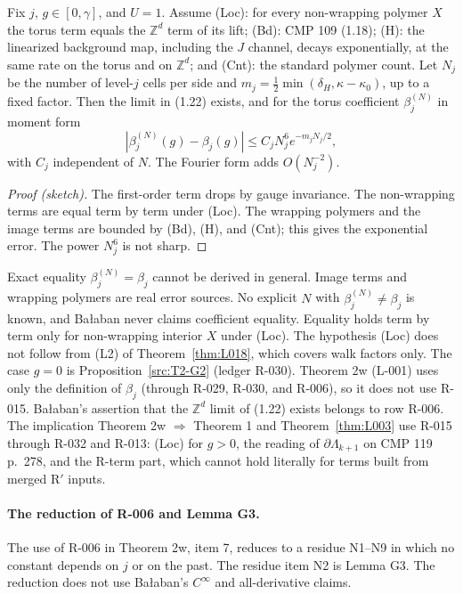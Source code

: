 \begin{proposition}\label{prop:L024}
Fix $j$, $g\in[0,\gamma]$, and $U=1$. Assume (Loc): for every non-wrapping polymer $X$ the torus term equals the $\mathbb Z^d$ term of its lift; (Bd): CMP 109 (1.18); (H): the linearized background map, including the $J$ channel, decays exponentially, at the same rate on the torus and on $\mathbb Z^d$; and (Cnt): the standard polymer count. Let $N_j$ be the number of level-$j$ cells per side and $m_j=\tfrac12\min(\delta_H,\kappa-\kappa_0)$, up to a fixed factor. Then the limit in (1.22) exists, and for the torus coefficient $\beta_j^{(N)}$ in moment form
\[ |\beta_j^{(N)}(g)-\beta_j(g)|\le C_jN_j^6e^{-m_jN_j/2}, \]
with $C_j$ independent of $N$. The Fourier form adds $O(N_j^{-2})$.
\end{proposition}
\begin{proof}[Proof (sketch)]
The first-order term drops by gauge invariance. The non-wrapping terms are equal term by term under (Loc). The wrapping polymers and the image terms are bounded by (Bd), (H), and (Cnt); this gives the exponential error. The power $N_j^6$ is not sharp.
\end{proof}
Exact equality $\beta_j^{(N)}=\beta_j$ cannot be derived in general. Image terms and wrapping polymers are real error sources. No explicit $N$ with $\beta_j^{(N)}\ne\beta_j$ is known, and Ba{\l}aban never claims coefficient equality. Equality holds term by term only for non-wrapping interior $X$ under (Loc). The hypothesis (Loc) does not follow from (L2) of Theorem~\ref{thm:L018}, which covers walk factors only. The case $g=0$ is Proposition~\ref{src:T2-G2} (ledger R-030).
Theorem 2w (L-001) uses only the definition of $\beta_j$ (through R-029, R-030, and R-006), so it does not use R-015. Ba{\l}aban's assertion that the $\mathbb Z^d$ limit of (1.22) exists belongs to row R-006. The implication Theorem 2w $\Rightarrow$ Theorem 1 and Theorem~\ref{thm:L003} use R-015 through R-032 and R-013: (Loc) for $g>0$, the reading of $\partial\Lambda_{k+1}$ on CMP 119 p.~278, and the R-term part, which cannot hold literally for terms built from merged R$'$ inputs.

\paragraph{The reduction of R-006 and Lemma G3.}
\begin{proposition}\label{src:T2-H0}
The use of R-006 in Theorem 2w, item 7, reduces to a residue N1--N9 in which no constant depends on $j$ or on the past. The residue item N2 is Lemma G3. The reduction does not use Ba{\l}aban's $C^\infty$ and all-derivative claims.
\end{proposition}

